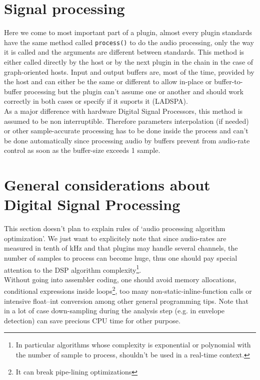 \section{Signal processing}

\noindent Here we come to most important part of a plugin, almost every plugin standards have the same method called \verb|process()| to do the audio processing, only the way it is called and the arguments are different between standards. This method is either called directly by the host or by the next plugin in the chain in the case of graph-oriented hosts. Input and output buffers are, most of the time, provided by the host and can either be the same or different to allow in-place or buffer-to-buffer processing but the plugin can't assume one or another and should work correctly in both cases or specify if it suports it (LADSPA).\\

\noindent As a major difference with hardware Digital Signal Processors, this method is assumed to be non interruptible. Therefore parameters interpolation (if needed) or other sample-accurate processing has to be done inside the process and can't be done automatically since processing audio by buffers prevent from audio-rate control as soon as the buffer-size exceeds 1 sample.



\section{General considerations about Digital Signal Processing}
\noindent This section doesn't plan to explain rules of `audio processing algorithm optimization'. We just want to explicitely note that since audio-rates are measured in tenth of kHz and that plugins may handle several channels, the number of samples to process can become huge, thus one should pay special attention to the DSP algorithm complexity\footnote{In particular algorithms whose complexity is exponential or polynomial with the number of sample to process, shouldn't be used in a real-time context.}.\\

\noindent Without going into assembler coding, one should avoid memory allocations, conditional expressions inside loops\footnote{It can break pipe-lining optimizations}, too many non-static-inline-function calls or intensive float--int conversion among other general programming tips. Note that in a lot of case down-sampling during the analysis step (e.g. in envelope detection) can save precious CPU time for other purpose.

